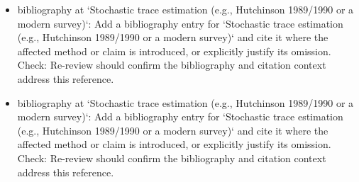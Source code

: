 \documentclass[11pt]{article}
\begin{document}
\begin{itemize}[leftmargin=*]
  \item [open] bibliography at `Stochastic trace estimation (e.g., Hutchinson 1989/1990 or a modern survey)`: Add a bibliography entry for `Stochastic trace estimation (e.g., Hutchinson 1989/1990 or a modern survey)` and cite it where the affected method or claim is introduced, or explicitly justify its omission. Check: Re-review should confirm the bibliography and citation context address this reference.
  \item [open] bibliography at `Stochastic trace estimation (e.g., Hutchinson 1989/1990 or a modern survey)`: Add a bibliography entry for `Stochastic trace estimation (e.g., Hutchinson 1989/1990 or a modern survey)` and cite it where the affected method or claim is introduced, or explicitly justify its omission. Check: Re-review should confirm the bibliography and citation context address this reference.
\end{itemize}
\end{document}
